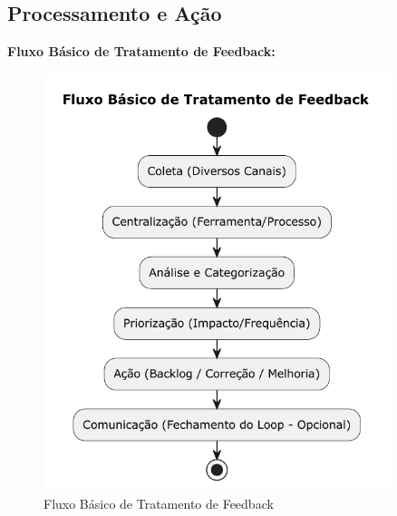 \subsection{Processamento e Ação}
\label{subsec:processamento-feedback}

\textbf{Fluxo Básico de Tratamento de Feedback:}

\begin{figure}[htbp]
    \centering
    \includegraphics[width=0.9\textwidth]{assets/diagrama-fluxo-feedback.pdf}
    \caption{Fluxo Básico de Tratamento de Feedback}
    \label{fig:fluxo-feedback}
\end{figure}

